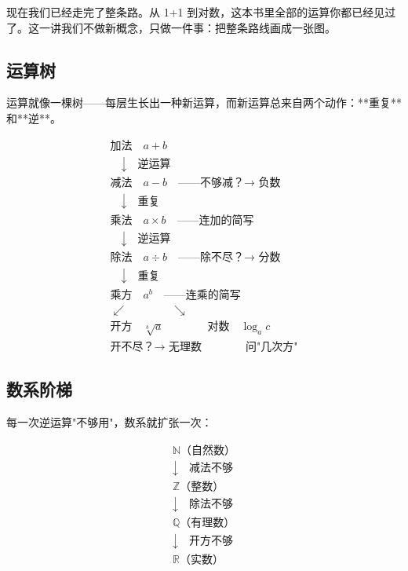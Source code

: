 

现在我们已经走完了整条路。从 1+1 到对数，这本书里全部的运算你都已经见过了。这一讲我们不做新概念，只做一件事：把整条路线画成一张图。

\subsection*{运算树}

运算就像一棵树——每层生长出一种新运算，而新运算总来自两个动作：**重复**和**逆**。

\[
\begin{array}{c}
\textbf{加法} \quad a+b \\
\quad\downarrow\quad \text{逆运算}\\
\textbf{减法} \quad a-b \quad\text{——不够减？→ 负数} \\
\quad\downarrow\quad \text{重复}\\
\textbf{乘法} \quad a\times b \quad\text{——连加的简写} \\
\quad\downarrow\quad \text{逆运算}\\
\textbf{除法} \quad a\div b \quad\text{——除不尽？→ 分数} \\
\quad\downarrow\quad \text{重复}\\
\textbf{乘方} \quad a^b \quad\text{——连乘的简写} \\
\swarrow \quad\quad\quad\quad \searrow \\
\textbf{开方} \quad \sqrt[b]{a} \qquad\qquad \textbf{对数} \quad \log_a c \\
\text{开不尽？→ 无理数} \qquad\qquad \text{问"几次方"}
\end{array}
\]

\subsection*{数系阶梯}

每一次逆运算"不够用"，数系就扩张一次：

\[
\begin{array}{c}
\mathbb{N}\text{（自然数）} \\
\downarrow\quad \text{减法不够} \\
\mathbb{Z}\text{（整数）} \\
\downarrow\quad \text{除法不够} \\
\mathbb{Q}\text{（有理数）} \\
\downarrow\quad \text{开方不够} \\
\mathbb{R}\text{（实数）}
\end{array}
\]

